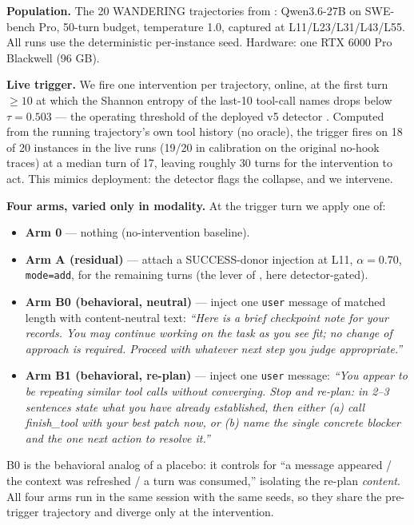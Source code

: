 \documentclass[11pt]{article}
\begin{document}
\textbf{Population.} The 20 WANDERING trajectories from \cite{residual_nulls,multichannel}: Qwen3.6-27B on SWE-bench Pro, 50-turn budget, temperature 1.0, captured at L11/L23/L31/L43/L55. All runs use the deterministic per-instance seed. Hardware: one RTX 6000 Pro Blackwell (96 GB).

\textbf{Live trigger.} We fire one intervention per trajectory, online, at the first turn $\geq 10$ at which the Shannon entropy of the last-10 tool-call names drops below $\tau=0.503$ --- the operating threshold of the deployed v5 detector \cite{tool_entropy}. Computed from the running trajectory's own tool history (no oracle), the trigger fires on 18 of 20 instances in the live runs (19/20 in calibration on the original no-hook traces) at a median turn of 17, leaving roughly 30 turns for the intervention to act. This mimics deployment: the detector flags the collapse, and we intervene.

\textbf{Four arms, varied only in modality.} At the trigger turn we apply one of:
\begin{itemize}
\item \textbf{Arm 0} --- nothing (no-intervention baseline).
\item \textbf{Arm A (residual)} --- attach a SUCCESS-donor injection at L11, $\alpha=0.70$, \texttt{mode=add}, for the remaining turns (the lever of \cite{residual_nulls}, here detector-gated).
\item \textbf{Arm B0 (behavioral, neutral)} --- inject one \texttt{user} message of matched length with content-neutral text: \emph{``Here is a brief checkpoint note for your records. You may continue working on the task as you see fit; no change of approach is required. Proceed with whatever next step you judge appropriate.''}
\item \textbf{Arm B1 (behavioral, re-plan)} --- inject one \texttt{user} message: \emph{``You appear to be repeating similar tool calls without converging. Stop and re-plan: in 2--3 sentences state what you have already established, then either (a) call finish\_tool with your best patch now, or (b) name the single concrete blocker and the one next action to resolve it.''}
\end{itemize}
B0 is the behavioral analog of a placebo: it controls for ``a message appeared / the context was refreshed / a turn was consumed,'' isolating the re-plan \emph{content}. All four arms run in the same session with the same seeds, so they share the pre-trigger trajectory and diverge only at the intervention.
\end{document}
